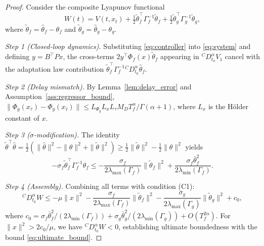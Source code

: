 \documentclass[10pt,a4paper]{amsart}
\begin{document}
\begin{proof}
Consider the composite Lyapunov functional
\begin{equation}
W(t) = V(t, x_t) + \tfrac{1}{2} \tilde{\theta}_f^{\!\top} \Gamma_f^{-1} \tilde{\theta}_f + \tfrac{1}{2} \tilde{\theta}_g^{\!\top} \Gamma_g^{-1} \tilde{\theta}_g,
\end{equation}
where $\tilde{\theta}_f = \hat{\theta}_f - \theta_f$ and $\tilde{\theta}_g = \hat{\theta}_g - \theta_g$.

\textit{Step 1 (Closed-loop dynamics).} Substituting \eqref{eq:controller} into \eqref{eq:system} and defining $y = B^{\!\top}\!Px$, the cross-terms $2y^{\!\top}\Phi_f(x)\tilde{\theta}_f$ appearing in ${}^{C}\!D^{\alpha}_{t_0}V_1$ cancel with the adaptation law contribution $\tilde{\theta}_f^{\!\top}\Gamma_f^{-1}{}^{C}\!D^{\alpha}_{t_0}\hat{\theta}_f$.

\textit{Step 2 (Delay mismatch).} By Lemma~\ref{lem:delay_error} and Assumption~\ref{ass:regressor_bound}, $\|\Phi_g(x_{\tau}) - \Phi_g(x_{\hat{\tau}})\| \leq L_{\Phi_g} L_x L_{\tau} M_D T_f^{\alpha}/\Gamma(\alpha+1)$, where $L_x$ is the H\"{o}lder constant of $x$.

\textit{Step 3 ($\sigma$-modification).} The identity $\tilde{\theta}^{\!\top}\hat{\theta} = \tfrac{1}{2}(\|\hat{\theta}\|^2 - \|\theta\|^2 + \|\tilde{\theta}\|^2) \geq \tfrac{1}{2}\|\tilde{\theta}\|^2 - \tfrac{1}{2}\|\theta\|^2$ yields
\begin{equation}
-\sigma_f \tilde{\theta}_f^{\!\top}\Gamma_f^{-1}\hat{\theta}_f \leq -\frac{\sigma_f}{2\lambda_{\max}(\Gamma_f)}\|\tilde{\theta}_f\|^2 + \frac{\sigma_f \bar{\theta}_f^2}{2\lambda_{\min}(\Gamma_f)}.
\end{equation}

\textit{Step 4 (Assembly).} Combining all terms with condition (C1):
\begin{equation}
{}^{C}\!D^{\alpha}_{t_0} W \leq -\mu\|x\|^2 - \frac{\sigma_f}{2\lambda_{\max}(\Gamma_f)}\|\tilde{\theta}_f\|^2 - \frac{\sigma_g}{2\lambda_{\max}(\Gamma_g)}\|\tilde{\theta}_g\|^2 + c_0,
\end{equation}
where $c_0 = \sigma_f\bar{\theta}_f^2/(2\lambda_{\min}(\Gamma_f)) + \sigma_g\bar{\theta}_g^2/(2\lambda_{\min}(\Gamma_g)) + O(T_f^{2\alpha})$. For $\|x\|^2 > 2c_0/\mu$, we have ${}^{C}\!D^{\alpha}_{t_0}W < 0$, establishing ultimate boundedness with the bound \eqref{eq:ultimate_bound}.
\end{proof}
\end{document}
